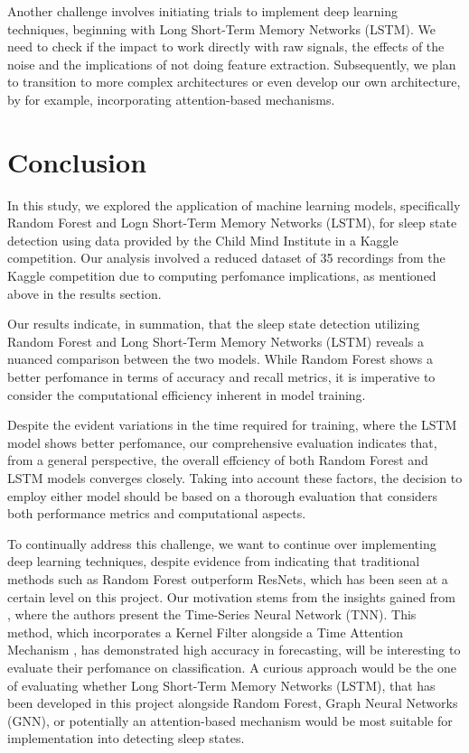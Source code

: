 \documentclass{article}
\begin{document}
Another challenge involves initiating trials to implement deep learning techniques, beginning with Long Short-Term Memory Networks (LSTM). We need to check if the impact to work directly with raw signals, the effects of the noise and the implications of not doing feature extraction. Subsequently, we plan to transition to more complex architectures or even develop our own architecture, by for example, incorporating attention-based mechanisms.

\section{Conclusion}

In this study, we explored the application of machine learning models, specifically Random Forest and Logn Short-Term Memory Networks (LSTM), for sleep state detection using data provided by the Child Mind Institute \cite{child-mind-institute-detect-sleep-states} in a Kaggle competition. Our analysis involved a reduced dataset of 35 recordings from the Kaggle competition due to computing perfomance implications, as mentioned above in the results section.

Our results indicate, in summation, that the sleep state detection utilizing Random Forest and Long Short-Term Memory Networks (LSTM) reveals a nuanced comparison between the two models. While Random Forest shows a better perfomance in terms of accuracy and recall metrics, it is imperative to consider the computational efficiency inherent in model training.

Despite the evident variations in the time required for training, where the LSTM model shows better perfomance, our comprehensive evaluation indicates that, from a general perspective, the overall effciency of both Random Forest and LSTM models converges closely. Taking into account these factors, the decision to employ either model should be based on a thorough evaluation that considers both performance metrics and computational aspects.

To continually address this challenge, we want to continue over implementing deep learning techniques, despite evidence from \cite{Sundararajan2021} indicating that traditional methods such as Random Forest outperform ResNets, which has been seen at a certain level on this project. Our motivation stems from the insights gained from \cite{Zhang2023}, where the authors present the Time-Series Neural Network (TNN). This method, which incorporates a Kernel Filter alongside a Time Attention Mechanism \cite{Zhang2023}, has demonstrated high accuracy in forecasting, will be interesting to evaluate their perfomance on classification. A curious approach would be the one of evaluating whether Long Short-Term Memory Networks (LSTM), that has been developed in this project alongside Random Forest, Graph Neural Networks (GNN), or potentially an attention-based mechanism would be most suitable for implementation into detecting sleep states.
\end{document}
